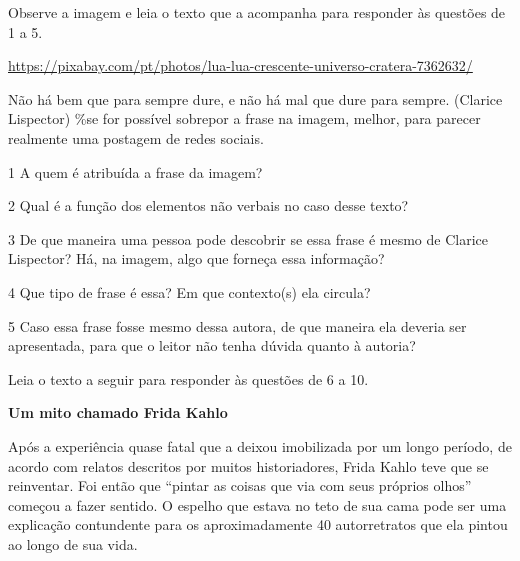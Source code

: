 {Observe a imagem e leia o texto que a acompanha para responder às
questões de 1 a 5.

\url{https://pixabay.com/pt/photos/lua-lua-crescente-universo-cratera-7362632/}

Não há bem que para sempre dure, e não há mal que dure para sempre.
(Clarice Lispector) \%se for possível sobrepor a frase na imagem,
melhor, para parecer realmente uma postagem de redes sociais.

\num{1} A quem é atribuída a frase da imagem?



\num{2} Qual é a função dos elementos não verbais no caso desse texto?



\num{3} De que maneira uma pessoa pode descobrir se essa frase é mesmo
de Clarice Lispector? Há, na imagem, algo que forneça essa informação?



\num{4} Que tipo de frase é essa? Em que contexto(s) ela circula?



\num{5} Caso essa frase fosse mesmo dessa autora, de que maneira ela
deveria ser apresentada, para que o leitor não tenha dúvida quanto à
autoria?



Leia o texto a seguir para responder às questões de 6 a 10.

\textbf{Um mito chamado Frida Kahlo}

Após a experiência quase fatal que a deixou imobilizada por um longo
período, de acordo com relatos descritos por muitos historiadores, Frida
Kahlo teve que se reinventar. Foi então que ``pintar as coisas que via
com seus próprios olhos'' começou a fazer sentido. O espelho que estava
no teto de sua cama pode ser uma explicação contundente para os
aproximadamente 40 autorretratos que ela pintou ao longo de sua vida.

}
